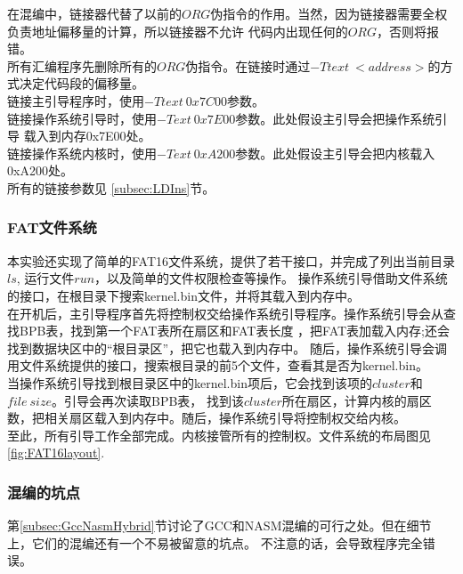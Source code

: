 \documentclass[a4paper]{article}
\begin{document}
    在混编中，链接器代替了以前的$ORG$伪指令的作用。当然，因为链接器需要全权负责地址偏移量的计算，所以链接器不允许
    代码内出现任何的$ORG$，否则将报错。\\
    
    所有汇编程序先删除所有的$ORG$伪指令。在链接时通过$-Ttext\ <address>$的方式决定代码段的偏移量。\\
    
    链接主引导程序时，使用$-Ttext\ 0x7C00$参数。 \\

    链接操作系统引导时，使用$-Text\ 0x7E00$参数。此处假设主引导会把操作系统引导
    载入到内存0x7E00处。\\ 
    
    链接操作系统内核时，使用$-Text\ 0xA200$参数。此处假设主引导会把内核载入0xA200处。\\ 

    所有的链接参数见 \ref{subsec:LDIns}节。
    \subsubsection{FAT文件系统}\label{subsec:filesystem_intro}
    本实验还实现了简单的FAT16文件系统，提供了若干接口，并完成了列出当前目录$ls$, 运行文件$run$，以及简单的文件权限检查等操作。
    操作系统引导借助文件系统的接口，在根目录下搜索kernel.bin文件，并将其载入到内存中。\\
    
    在开机后，主引导程序首先将控制权交给操作系统引导程序。操作系统引导会从查找BPB表，找到第一个FAT表所在扇区和FAT表长度
    ，把FAT表加载入内存;还会找到数据块区中的``根目录区''，把它也载入到内存中。
    随后，操作系统引导会调用文件系统提供的接口，搜索根目录的前5个文件，查看其是否为kernel.bin。\\
    
    当操作系统引导找到根目录区中的kernel.bin项后，它会找到该项的$cluster$和$file\ size$。引导会再次读取BPB表，
    找到该$cluster$所在扇区，计算内核的扇区数，把相关扇区载入到内存中。随后，操作系统引导将控制权交给内核。\\
    
    至此，所有引导工作全部完成。内核接管所有的控制权。文件系统的布局图见\ref{fig:FAT16layout}.
    \subsubsection{混编的坑点}\label{subsec:gccnamspitfall}
    第\ref{subsec:GccNasmHybrid}节讨论了GCC和NASM混编的可行之处。但在细节上，它们的混编还有一个不易被留意的坑点。
    不注意的话，会导致程序完全错误。\\
    
\end{document}
